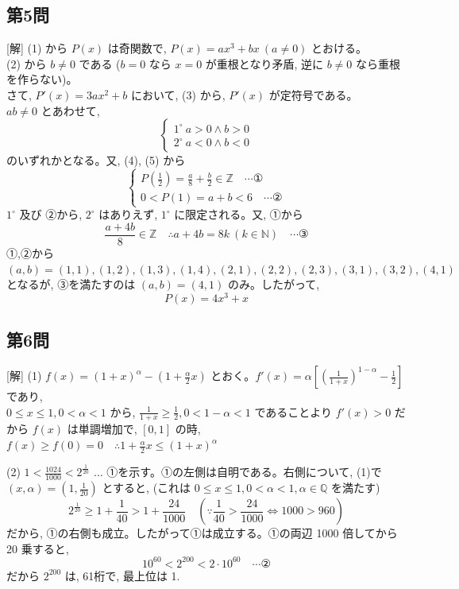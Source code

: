 \documentclass[../main.tex]{subfiles}
\begin{document}
\begin{itemize}
    \subsection*{第5問}

    [解] (1) から $P(x)$ は奇関数で, $P(x) = ax^3 + bx \ (a \neq 0)$ とおける。\\
    (2) から $b \neq 0$ である ($b=0$ なら $x=0$ が重根となり矛盾, 逆に $b \neq 0$ なら重根を作らない)。\\
    さて, $P'(x) = 3ax^2 + b$ において, (3) から, $P'(x)$ が定符号である。\\
    $ab \neq 0$ とあわせて,
    \[
      \begin{cases}
        1^\circ \ a > 0 \land b > 0 \\
        2^\circ \ a < 0 \land b < 0
      \end{cases}
    \]
    のいずれかとなる。又, (4), (5) から
    \[
      \begin{cases}
        P\left(\frac{1}{2}\right) = \frac{a}{8} + \frac{b}{2} \in \mathbb{Z} \quad \cdots \text{①} \\
        0 < P(1) = a+b < 6 \quad \cdots \text{②}
      \end{cases}
    \]
    $1^\circ$ 及び ②から, $2^\circ$ はありえず, $1^\circ$ に限定される。又, ①から
    \[
      \frac{a+4b}{8} \in \mathbb{Z} \quad \therefore a+4b = 8k \ (k \in \mathbb{N}) \quad \cdots \text{③}
    \]
    ①,②から $(a,b) = (1,1),(1,2),(1,3),(1,4),(2,1),(2,2),(2,3),(3,1),(3,2),(4,1)$ となるが, ③を満たすのは $(a,b) = (4,1)$ のみ。したがって,
    \[
      P(x) = 4x^3 + x
    \]

    \subsection*{第6問}

    [解] (1) $f(x) = (1+x)^\alpha - \left(1 + \frac{\alpha}{2} x\right)$ とおく。$f'(x) = \alpha \left[ \left(\frac{1}{1+x}\right)^{1-\alpha} - \frac{1}{2} \right]$ であり,\\
    $0 \le x \le 1, 0 < \alpha < 1$ から, $\frac{1}{1+x} \ge \frac{1}{2}, 0 < 1-\alpha < 1$ であることより $f'(x) > 0$ だから $f(x)$ は単調増加で, $[0,1]$ の時, $f(x) \ge f(0) = 0 \quad \therefore 1 + \frac{\alpha}{2} x \le (1+x)^\alpha$

    (2) $1 < \frac{1024}{1000} < 2^{\frac{1}{20}}$ $\dots$ ①を示す。①の左側は自明である。右側について, (1)で $(x, \alpha) = \left(1, \frac{1}{20}\right)$ とすると, (これは $0 \le x \le 1, 0 < \alpha < 1, \alpha \in \mathbb{Q}$ を満たす)
    \[
      2^{\frac{1}{20}} \ge 1 + \frac{1}{40} > 1 + \frac{24}{1000} \quad \left(\because \frac{1}{40} > \frac{24}{1000} \iff 1000 > 960\right)
    \]
    だから, ①の右側も成立。したがって①は成立する。①の両辺 1000 倍してから 20 乗すると,
    \[
      10^{60} < 2^{200} < 2 \cdot 10^{60} \quad \cdots \text{②}
    \]
    だから $2^{200}$ は, 61桁で, 最上位は 1.


\end{itemize}
\end{document}
